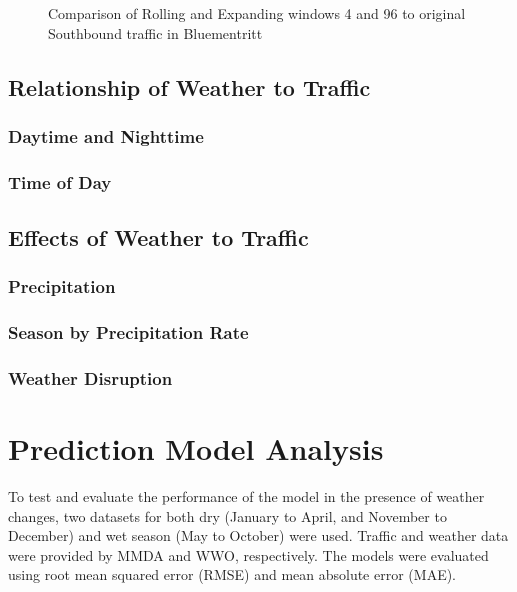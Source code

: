 \begin{figure}
    \centering
      \captionsetup{justification=centering}
    \hfill
    \caption{Comparison of Rolling and Expanding windows 4 and 96 to original Southbound traffic in Bluementritt}
\end{figure}


\subsection{Relationship of Weather to Traffic}
\subsubsection{Daytime and Nighttime}
\subsubsection{Time of Day}


\subsection{Effects of Weather to Traffic}
\subsubsection{Precipitation}
\subsubsection{Season by Precipitation Rate}
\subsubsection{Weather Disruption}



\section{Prediction Model Analysis}
To test and evaluate the performance of the model in the presence of weather changes, two datasets for both dry (January to April, and November to December) and wet season (May to October) were used. Traffic and weather data were provided by MMDA and WWO, respectively. The models were evaluated using root mean squared error (RMSE) and mean absolute error (MAE). 


